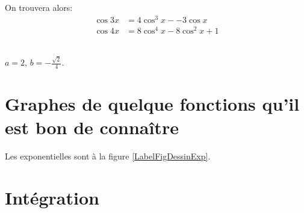 \noindent On trouvera alors: \[ \begin{array} {rl}
					\cos3x&=4\cos^3x--3\cos x\\
					\cos4x&=8\cos^4x-8\cos^2x+1\end{array}\]


\\
$a=2$, $b=-\frac{\sqrt2}{4}$.


\section{Graphes de quelque fonctions qu'il est bon de connaître}


Les exponentielles sont à la figure \ref{LabelFigDessinExp}.
\newcommand{\CaptionFigDessinExp}{Des exponentielles}


%

%

%

%

%

%

%

\section{Intégration}

